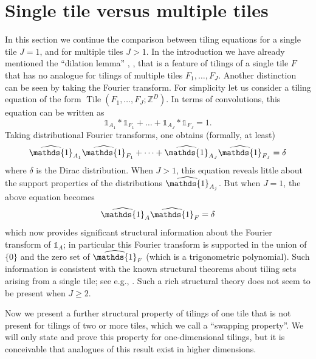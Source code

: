 \documentclass[reqno,a4paper,12pt]{amsart}
\numberwithin{equation}{section}
\numberwithin{figure}{section}
\def\Z{\mathbb{Z}}
\def\one{\mathds{1}}
\renewcommand\geq{\geqslant}
\newcommand{\ft}[1]{\widehat #1}
\newcommand{\Tile}{\operatorname{Tile}}
\theoremstyle{plain}
\theoremstyle{definition}
\begin{document}
\section{Single tile versus multiple tiles}\label{single-multi}

In this section we continue the comparison between tiling equations for a single tile $J=1$, and for multiple tiles $J>1$.  In the introduction we have already mentioned the ``dilation lemma'' \cite[Proposition 3.1]{BH}, \cite[Lemma 3.1]{GT}, \cite{tij} that is a feature of tilings of a single tile $F$ that has no analogue for tilings of multiple tiles $F_1,\dots,F_J$.  Another distinction can be seen by taking the Fourier transform.  For simplicity let us consider a tiling equation of the form $\Tile(F_1,\dots,F_J; \Z^D)$.  In terms of convolutions, this equation can be written as
$$ \one_{A_1} * \one_{F_1} + \dots + \one_{A_J} * \one_{F_J} = 1.$$
Taking distributional Fourier transforms, one obtains (formally, at least)
$$ \ft{\one_{A_1}} \ft{\one_{F_1}} + \dots + \ft{\one_{A_J}} \ft{\one_{F_J}} = \delta$$
where $\delta$ is the Dirac distribution.  When $J>1$, this equation reveals little about the support properties of the distributions $\ft{\one_{A_j}}$.  But when $J=1$, the above equation becomes
$$ \ft{\one_{A}} \ft{\one_{F}} = \delta$$
which now provides significant structural information about the Fourier transform of $\one_A$; in particular this Fourier transform is supported in the union of $\{0\}$ and the zero set of $\ft{\one_F}$ (which is a trigonometric polynomial).  
Such information is consistent with the known structural theorems about tiling sets arising from a single tile; see e.g., \cite[Remark 1.8]{GT}.  Such a rich structural theory does not seem to be present when $J \geq 2$.

Now we present a further structural property of tilings of one tile that is not present for tilings of two or more tiles, which we call a ``swapping property''.  We will only state and prove this property for one-dimensional tilings, but it is conceivable that analogues of this result exist in higher dimensions.
\end{document}
